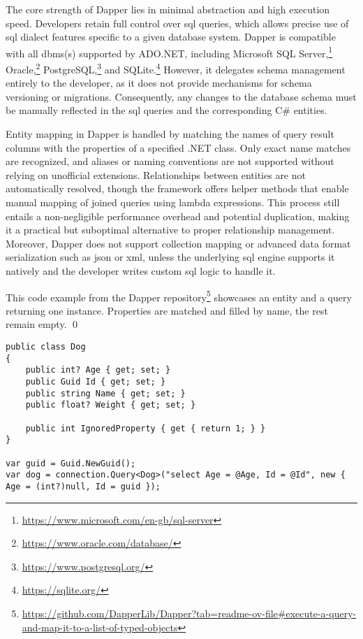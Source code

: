 The core strength of Dapper lies in minimal abstraction and high execution speed. Developers retain full control over \acrshort{sql} queries, which allows precise use of \acrshort{sql} dialect features specific to a given database system. Dapper is compatible with all \acrshort{dbms}(s) supported by ADO.NET, including Microsoft SQL Server,\footnote{\url{https://www.microsoft.com/en-gb/sql-server}} Oracle,\footnote{\url{https://www.oracle.com/database/}}  PostgreSQL,\footnote{\url{https://www.postgresql.org/}} and SQLite.\footnote{\url{https://sqlite.org/}} However, it delegates schema management entirely to the developer, as it does not provide mechanisms for schema versioning or migrations. Consequently, any changes to the database schema must be manually reflected in the \acrshort{sql} queries and the corresponding C\# entities.

Entity mapping in Dapper is handled by matching the names of query result columns with the properties of a specified .NET class. Only exact name matches are recognized, and aliases or naming conventions are not supported without relying on unofficial extensions. Relationships between entities are not automatically resolved, though the framework offers helper methods that enable manual mapping of joined queries using lambda expressions. This process still entails a non-negligible performance overhead and potential duplication, making it a practical but suboptimal alternative to proper relationship management. Moreover, Dapper does not support collection mapping or advanced data format serialization such as \acrshort{json} or \acrshort{xml}, unless the underlying \acrshort{sql} engine supports it natively and the developer writes custom \acrshort{sql} logic to handle it.

\begin{example}
\small
This code example from the Dapper repository\footnote{\url{https://github.com/DapperLib/Dapper?tab=readme-ov-file\#execute-a-query-and-map-it-to-a-list-of-typed-objects}} showcases an entity and a query returning one instance. Properties are matched and filled by name, the rest remain empty.
\qed

\begin{lstlisting}[language=CSharp]
public class Dog
{
    public int? Age { get; set; }
    public Guid Id { get; set; }
    public string Name { get; set; }
    public float? Weight { get; set; }

    public int IgnoredProperty { get { return 1; } }
}

var guid = Guid.NewGuid();
var dog = connection.Query<Dog>("select Age = @Age, Id = @Id", new { Age = (int?)null, Id = guid });
\end{lstlisting}
\end{example}

